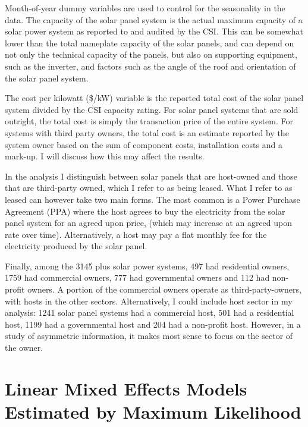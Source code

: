 \documentclass[a4paper]{article}
\begin{document}
Month-of-year dummy variables are used to control for the seasonality in the data. The capacity of the solar panel system is the actual maximum capacity of a solar power system as reported to and audited by the CSI. This can be somewhat lower than the total nameplate capacity of the solar panels, and can depend on not only the technical capacity of the panels, but also on supporting equipment, such as the inverter, and factors such as the angle of the roof and orientation of the solar panel system.

The cost per kilowatt (\$/kW) variable is the reported total cost of the solar panel system divided by the CSI capacity rating. For solar panel systems that are sold outright, the total cost is simply the transaction price of the entire system. For systems with third party owners, the total cost is an estimate reported by the system owner based on the sum of component costs, installation costs and a mark-up. I will discuss how this may affect the results.

In the analysis I distinguish between solar panels that are host-owned and those that are third-party owned, which I refer to as being leased. What I refer to as leased can however take two main forms. The most common is a Power Purchase Agreement (PPA) where the host agrees to buy the electricity from the solar panel system for an agreed upon price, (which may increase at an agreed upon rate over time). Alternatively, a host may pay a flat monthly fee for the electricity produced by the solar panel.

Finally, among the 3145 plus solar power systems, 497 had residential owners, 1759 had commercial owners, 777 had governmental owners and 112 had non-profit owners. A portion of the commercial owners operate as third-party-owners, with hosts in the other sectors. Alternatively, I could include host sector in my analysis: 1241 solar panel systems had a commercial host, 501 had a residential host, 1199 had a governmental host and 204 had a non-profit host. However, in a study of asymmetric information, it makes most sense to focus on the sector of the owner.


\section{Linear Mixed Effects Models Estimated by Maximum Likelihood}
\end{document}

